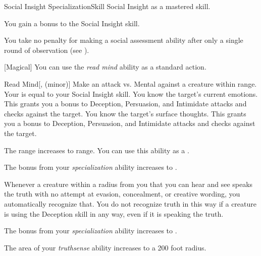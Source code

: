     \begin{feat}{Social Insight Specialization}{Skill}
        \featpre Social Insight as a mastered skill.

         You gain a  bonus to the Social Insight skill.

         You take no penalty for making a social assessment ability after only a single round of observation (see ).

        [Magical] You can use the \textit{read mind} ability as a standard action.
        \begin{freeability}{Read Mind}[,  (minor)]
            Make an attack vs. Mental against a creature within \rngclose range.
            Your  is equal to your Social Insight skill.
            \hit You know the target's current emotions.
            This grants you a  bonus to Deception, Persuasion, and Intimidate attacks and checks against the target.
            \crit You know the target's surface thoughts.
            This grants you a  bonus to Deception, Persuasion, and Intimidate attacks and checks against the target.

            \rankline
             The range increases to \rnglong range.
             You can use this ability as a .
        \end{freeability}

         The bonus from your \textit{specialization} ability increases to .

         Whenever a creature within a \arealarge radius  from you that you can hear and see speaks the truth with no attempt at evasion, concealment, or creative wording, you automatically recognize that.
        You do not recognize truth in this way if a creature is using the Deception skill in any way, even if it is speaking the truth.

         The bonus from your \textit{specialization} ability increases to .

         The area of your \textit{truthsense} ability increases to a 200 foot radius.
    \end{feat}

